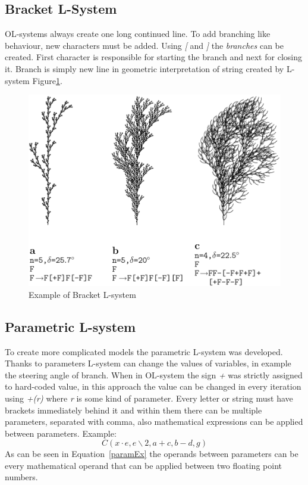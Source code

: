 \documentclass[b5paper,twoside,11pt]{article}
\renewcommand{\figurename}{Figure}
\begin{document}
\subsection{Bracket L-System}
OL-systems always create one long continued line. To add branching like behaviour, new characters must be added. Using \textit{[} and \textit{]} the \textit{branches} can be created. First character is responsible for starting the branch and next for closing it. Branch is simply new line in geometric interpretation of string created by L-system \figurename\ref{branchingL}.
\begin{figure}[!htp]
\centering
  \includegraphics[width=0.7\linewidth]{branchingL}
\caption{Example of Bracket L-system\cite{prusinABOP} \label{branchingL}}
\end{figure}





\subsection{Parametric L-system}
To create more complicated models the parametric L-system was developed. Thanks to parameters L-system can change the values of variables, in example the steering angle of branch. When in OL-system the sign \textit{+} was strictly assigned to hard-coded value, in this approach the value can be changed in every iteration using \textit{+(r)} where \textit{r} is some kind of parameter. Every letter or string must have brackets immediately behind it and within them there can be multiple parameters, separated with comma, also mathematical expressions can be applied between parameters. Example:
\begin{equation}\label{paramEx}
C(x\cdot e,e\backslash 2,a+c,b-d,g)
\end{equation}
As can be seen in Equation~\ref{paramEx} the operands between parameters can be every mathematical operand that can be applied between two floating point numbers.
\end{document}
